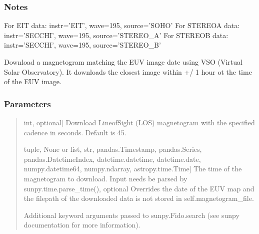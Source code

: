 \documentclass[letterpaper,10pt,english]{sphinxmanual}
\begin{document}
\begin{fulllineitems}
\begin{fulllineitems}
\subsubsection{Notes}
\label{\detokenize{pycatch/pycatch:notes}}
\sphinxAtStartPar
For EIT data: instr=’EIT’, wave=195, source=’SOHO’
For STEREO\sphinxhyphen{}A data: instr=’SECCHI’, wave=195, source=’STEREO\_A’
For STEREO\sphinxhyphen{}B data: instr=’SECCHI’, wave=195, source=’STEREO\_B’

\end{fulllineitems}


\begin{fulllineitems}
\label{\detokenize{pycatch/pycatch:pycatch.pycatch.pycatch.download_magnetogram}}
\pysigstartsignatures
{}
\pysigstopsignatures
\sphinxAtStartPar
Download a magnetogram matching the EUV image date using VSO (Virtual Solar Observatory). It downloads the closest image within +/\sphinxhyphen{} 1 hour ot the time of the EUV image.


\subsubsection{Parameters}
\label{\detokenize{pycatch/pycatch:id15}}\begin{quote}
\begin{description}
\sphinxlineitem{cadence}{[}int, optional{]}
\sphinxAtStartPar
Download Line\sphinxhyphen{}of\sphinxhyphen{}Sight (LOS) magnetogram with the specified cadence in seconds. Default is 45.

\sphinxlineitem{time}{[}tuple, None or list, str, pandas.Timestamp, pandas.Series, pandas.DatetimeIndex, datetime.datetime, datetime.date, numpy.datetime64, numpy.ndarray, astropy.time.Time{]}
\sphinxAtStartPar
The time of the magnetogram to download. Input needs be parsed by sunpy.time.parse\_time(), optional
Overrides the date of the EUV map and the filepath of the downloaded data is not stored in self.magnetogram\_file.

\sphinxAtStartPar
Additional keyword arguments passed to sunpy.Fido.search (see sunpy documentation for more information).


\end{description}
\end{quote}
\end{fulllineitems}
\end{fulllineitems}
\end{document}
